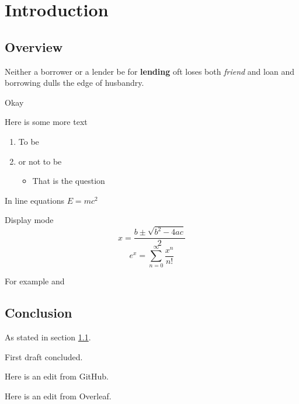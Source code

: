 \chapter{Introduction}

\section{Overview}
\label{Sec:Overview}

Neither a borrower or a lender be for \textbf{lending} oft loses both \textit{friend} and loan and borrowing dulls the edge of husbandry.

 Okay
 
 Here is some more text

\begin{enumerate}
\item To be
\item or not to be
\begin{itemize}
\item That is the question
\end{itemize}
\end{enumerate}

In line equations $E=mc^2$

Display mode
\[
x = \frac{b\pm\sqrt{b^2-4ac}}{2}
\]
\[
e^x = \sum_{n=0}^\infty \frac{x^n}{n!}
\]

For example \cite[Section 3]{Bunce2003ThePreduals} and \cite{Kaup1977AlgebraicBanachmanifolds}

\section{Conclusion}

As stated in section \ref{Sec:Overview}.

First draft concluded.

Here is an edit from GitHub.

Here is an edit from Overleaf.
